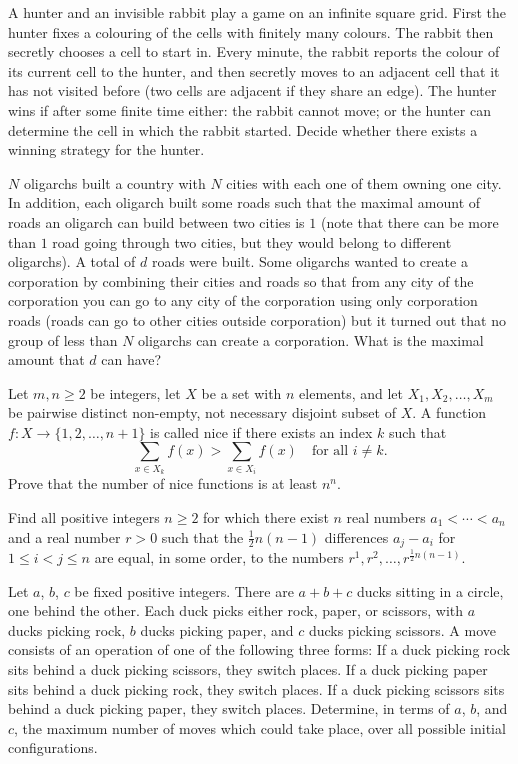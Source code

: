 \documentclass[11pt]{scrartcl}
\begin{document}
\begin{problem}[3470579368412517052]
	A hunter and an invisible rabbit play a game on an infinite square grid. First the hunter fixes a colouring of the cells with finitely many colours. The rabbit then secretly chooses a cell to start in. Every minute, the rabbit reports the colour of its current cell to the hunter, and then secretly moves to an adjacent cell that it has not visited before (two cells are adjacent if they share an edge). The hunter wins if after some finite time either:
the rabbit cannot move; or
the hunter can determine the cell in which the rabbit started.
Decide whether there exists a winning strategy for the hunter.
\end{problem}
\begin{problem}[4439711278400170990]
	$N$ oligarchs built a country with $N$ cities with each one of them owning one city. In addition, each oligarch built some roads such that the maximal amount of roads an oligarch can build between two cities is $1$ (note that there can be more than $1$ road going through two cities, but they would belong to different oligarchs).
A total of $d$ roads were built. Some oligarchs wanted to create a corporation by combining their cities and roads so that from any city of the corporation you can go to any city of the corporation using only corporation roads (roads can go to other cities outside corporation) but it turned out that no group of less than $N$ oligarchs can create a corporation. What is the maximal amount that $d$ can have?
\end{problem}
\begin{problem}[967014444176640]
Let $m,n \geqslant 2$ be integers, let $X$ be a set with $n$ elements, and let $X_1,X_2,\ldots,X_m$ be pairwise distinct non-empty, not necessary disjoint subset of $X$. A function $f \colon X \to \{1,2,\ldots,n+1\}$ is called nice if there exists an index $k$ such that\[\sum_{x \in X_k} f(x)>\sum_{x \in X_i} f(x) \quad \text{for all } i \ne k.\]Prove that the number of nice functions is at least $n^n$.
\end{problem}
\begin{problem}[596902679696332]
Find all positive integers $n \geqslant 2$ for which there exist $n$ real numbers $a_1<\cdots< a_n$ and a real number $r>0$ such that the $\tfrac{1}{2}n(n-1)$ differences $a_j-a_i$ for $1 \leqslant i<j \leqslant n$ are equal, in some order, to the numbers $r^1,r^2,\ldots,r^{\frac{1}{2}n(n-1)}$.
\end{problem}
\begin{problem}[1634257707699822785]
Let $a$, $b$, $c$ be fixed positive integers. There are $a+b+c$ ducks sitting in a
circle, one behind the other. Each duck picks either rock, paper, or scissors, with $a$ ducks
picking rock, $b$ ducks picking paper, and $c$ ducks picking scissors.
A move consists of an operation of one of the following three forms:
If a duck picking rock sits behind a duck picking scissors, they switch places.
If a duck picking paper sits behind a duck picking rock, they switch places.
If a duck picking scissors sits behind a duck picking paper, they switch places.
Determine, in terms of $a$, $b$, and $c$, the maximum number of moves which could take
place, over all possible initial configurations.
\end{problem}
\end{document}
